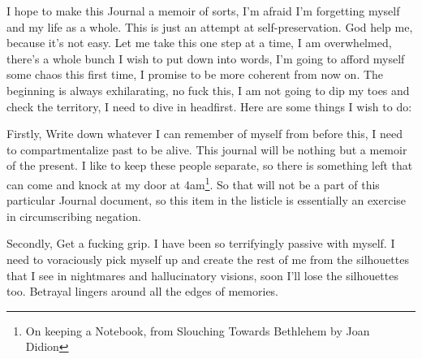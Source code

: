 \noindent {}

\noindent I hope to make this Journal a memoir of sorts, I'm afraid I'm forgetting myself and my life as a whole. This is just an attempt at self-preservation. God help me, because it's not easy. Let me take this one step at a time, I am overwhelmed, there's a whole bunch I wish to put down into words, I'm going to afford myself some chaos this first time, I promise to be more coherent from now on. The beginning is always exhilarating, no fuck this, I am not going to dip my toes and check the territory, I need to dive in headfirst. Here are some things I wish to do: 

Firstly, Write down whatever I can remember of myself from before this, I need to compartmentalize past to be alive. This journal will be nothing but a memoir of the present. I like to keep these people separate, so there is something left that can come and knock at my door at 4am\footnote{On keeping a Notebook, from Slouching Towards Bethlehem by Joan Didion}. So that will not be a part of this particular Journal document, so this item in the listicle is essentially an exercise in circumscribing negation.

Secondly, Get a fucking grip. I have been so terrifyingly passive with myself. I need to voraciously pick myself up and create the rest of me from the silhouettes that I see in nightmares and hallucinatory visions, soon I'll lose the silhouettes too. Betrayal lingers around all the edges of memories.

